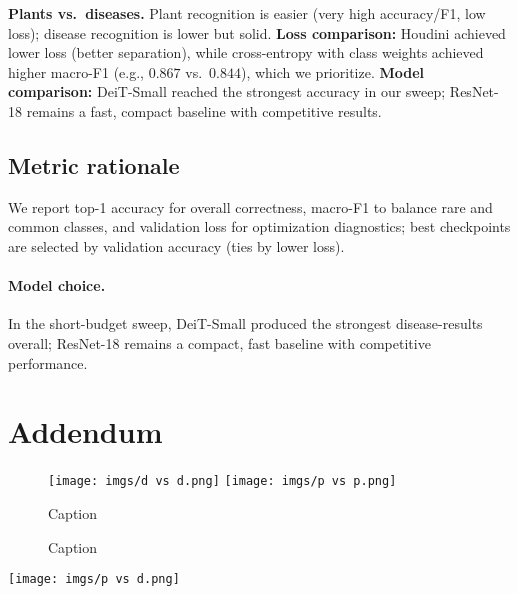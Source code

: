 \documentclass{article}
\begin{document}
\textbf{Plants vs.\ diseases.} Plant recognition is easier (very high accuracy/F1, low loss); disease recognition is lower but solid. \textbf{Loss comparison:} Houdini achieved lower loss (better separation), while cross-entropy with class weights achieved higher macro-F1 (e.g., $0.867$ vs.\ $0.844$), which we prioritize. \textbf{Model comparison:} DeiT-Small reached the strongest accuracy in our sweep; ResNet-18 remains a fast, compact baseline with competitive results.



\subsection{Metric rationale}
We report top-1 accuracy for overall correctness, macro-F1 to balance rare and common classes, and validation loss for optimization diagnostics; best checkpoints are selected by validation accuracy (ties by lower loss).

\paragraph{Model choice.}
In the short-budget sweep, DeiT-Small produced the strongest disease-results overall; ResNet-18 remains a compact, fast baseline with competitive performance.

\nocite{*}




\section{Addendum}
\begin{figure}[H]
    \centering
    \texttt{[image: imgs/d vs d.png]}
    \texttt{[image: imgs/p vs p.png]}
    \caption{Caption}
    \label{fig:placeholder}
\end{figure}
\begin{figure}[h!]
    \centering
    \caption{Caption}
    \label{fig:placeholder}
\end{figure}
\texttt{[image: imgs/p vs d.png]}
\end{document}
